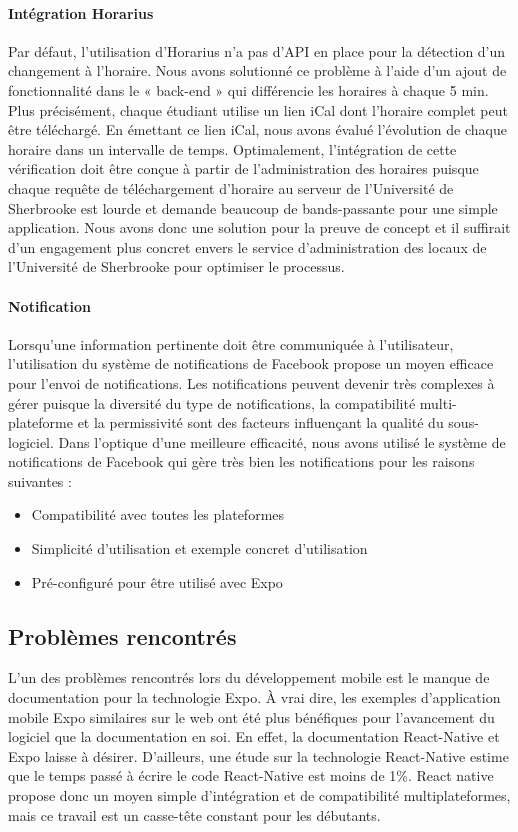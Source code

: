         \paragraph{Intégration Horarius}
        Par défaut, l'utilisation d'Horarius n'a pas d'API en place pour la détection d'un changement à l'horaire. Nous avons solutionné ce problème à l'aide d'un ajout de fonctionnalité dans le « back-end » qui différencie les horaires à chaque 5 min. Plus précisément, chaque étudiant utilise un lien iCal dont l'horaire complet peut être téléchargé. En émettant ce lien iCal, nous avons évalué l'évolution de chaque horaire dans un intervalle de temps. Optimalement, l'intégration de cette vérification doit être conçue à partir de l'administration des horaires puisque chaque requête de téléchargement d'horaire au serveur de l'Université de Sherbrooke est lourde et demande beaucoup de bands-passante pour une simple application. Nous avons donc une solution pour la preuve de concept et il suffirait d'un engagement plus concret envers le service d'administration des locaux de l'Université de Sherbrooke pour optimiser le processus.

        \paragraph{Notification}
        Lorsqu'une information pertinente doit être communiquée à l'utilisateur, l'utilisation du système de notifications de Facebook propose un moyen efficace pour l'envoi de notifications. Les notifications peuvent devenir très complexes à gérer puisque la diversité du type de notifications, la compatibilité multi-plateforme et la permissivité sont des facteurs influençant la qualité du sous-logiciel. Dans l'optique d'une meilleure efficacité, nous avons utilisé le système de notifications de Facebook qui gère très bien les notifications pour les raisons suivantes :
        \begin{itemize}
            \item Compatibilité avec toutes les plateformes
            \item Simplicité d'utilisation et exemple concret d'utilisation
            \item Pré-configuré pour être utilisé avec Expo
        \end{itemize}
    
    \subsection{Problèmes rencontrés}
    L'un des problèmes rencontrés lors du développement mobile est le manque de documentation pour la technologie Expo. À vrai dire, les exemples d'application mobile Expo similaires sur le web ont été plus bénéfiques pour l'avancement du logiciel que la documentation en soi. En effet, la documentation React-Native et Expo laisse à désirer. D'ailleurs, une étude sur la technologie React-Native estime que le temps passé à écrire le code React-Native est moins de 1\%. React native propose donc un moyen simple d'intégration et de compatibilité multiplateformes, mais ce travail est un casse-tête constant pour les débutants.

